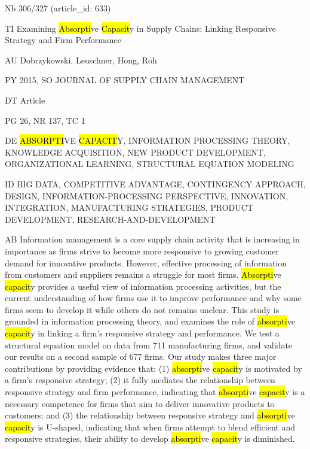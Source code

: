\documentclass[a4paper]{article}
\begin{document}
\vspace*{-2cm}
Nb \tabto{0cm}306/327 (article\_id: 633)\par
TI \tabto{0cm}Examining \hl{Absorpti}ve \hl{Capacit}y in Supply Chains: Linking Responsive Strategy and Firm Performance\par
AU \tabto{0cm}Dobrzykowski, Leuschner, Hong, Roh\par
PY \tabto{0cm}2015, SO JOURNAL OF SUPPLY CHAIN MANAGEMENT\par
DT \tabto{0cm}Article\par
PG \tabto{0cm}26, NR 137, TC 1\par
DE \tabto{0cm}\hl{ABSORPTI}VE \hl{CAPACIT}Y, INFORMATION PROCESSING THEORY, KNOWLEDGE ACQUISITION, NEW PRODUCT DEVELOPMENT, ORGANIZATIONAL LEARNING, STRUCTURAL EQUATION MODELING\par
ID \tabto{0cm}BIG DATA, COMPETITIVE ADVANTAGE, CONTINGENCY APPROACH, DESIGN, INFORMATION-PROCESSING PERSPECTIVE, INNOVATION, INTEGRATION, MANUFACTURING STRATEGIES, PRODUCT DEVELOPMENT, RESEARCH-AND-DEVELOPMENT\par
AB \tabto{0cm}Information management is a core supply chain activity that is increasing in importance as firms strive to become more responsive to growing customer demand for innovative products. However, effective processing of information from customers and suppliers remains a struggle for most firms. \hl{Absorpti}ve \hl{capacit}y provides a useful view of information processing activities, but the current understanding of how firms use it to improve performance and why some firms seem to develop it while others do not remains unclear. This study is grounded in information processing theory, and examines the role of \hl{absorpti}ve \hl{capacit}y in linking a firm's responsive strategy and performance. We test a structural equation model on data from 711 manufacturing firms, and validate our results on a second sample of 677 firms. Our study makes three major contributions by providing evidence that: (1) \hl{absorpti}ve \hl{capacit}y is motivated by a firm's responsive strategy; (2) it fully mediates the relationship between responsive strategy and firm performance, indicating that \hl{absorpti}ve \hl{capacit}y is a necessary competence for firms that aim to deliver innovative products to customers; and (3) the relationship between responsive strategy and \hl{absorpti}ve \hl{capacit}y is U-shaped, indicating that when firms attempt to blend efficient and responsive strategies, their ability to develop \hl{absorpti}ve \hl{capacit}y is diminished.\par
\clearpage
\end{document}
